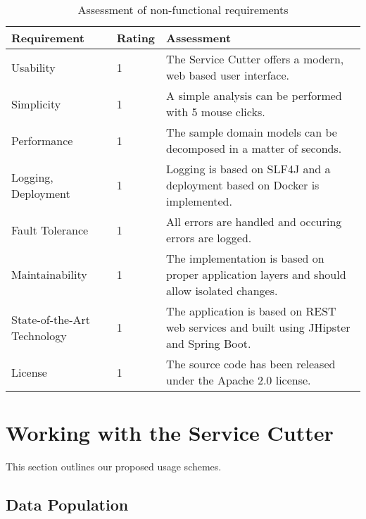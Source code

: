 \begin{table}[H]
	\centering
	\caption{Assessment of non-functional requirements}
	\label{tab:conclusionNonFunctional}
	\begin{tabular}{|p{100pt}|l|p{250pt}|}
	\hline \textbf{Requirement} & \textbf{Rating} & \textbf{Assessment} \\ 
	\hline Usability & 1 & The Service Cutter offers a modern, web based user interface. \\
	\hline Simplicity & 1 & A simple analysis can be performed with 5 mouse clicks. \\
	\hline Performance & 1 & The sample domain models can be decomposed in a matter of seconds. \\ %
	\hline Logging, \newline Deployment & 1 & Logging is based on SLF4J and a deployment based on Docker is implemented. \\
	\hline Fault Tolerance & 1 & All errors are handled and occuring errors are logged. \\
	\hline Maintainability & 1 & The implementation is based on proper application layers and should allow isolated changes. \\
	\hline State-of-the-Art Technology & 1 & The application is based on REST web services and built using JHipster and Spring Boot. \\
	\hline License & 1 & The source code has been released under the Apache 2.0 license. \\
	\hline 
	\end{tabular} 
\end{table}


\section{Working with the Service Cutter} %

This section outlines our proposed usage schemes.



\subsection{Data Population}



